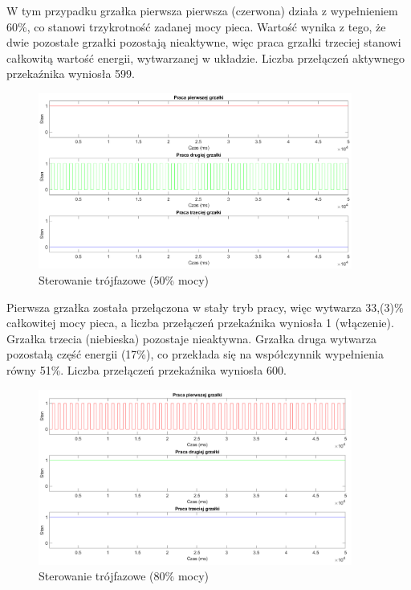 \documentclass[a4paper,twoside,12pt]{book}
\begin{document}
W tym przypadku grzałka pierwsza pierwsza (czerwona) działa z wypełnieniem 60\%, co stanowi trzykrotność zadanej mocy pieca. Wartość wynika z tego, że dwie pozostałe grzałki pozostają nieaktywne, więc praca grzałki trzeciej stanowi całkowitą wartość energii, wytwarzanej w układzie. Liczba przełączeń aktywnego przekaźnika wyniosła 599.

\newpage
\begin{figure}[h]
	\centering
	\includegraphics[width=0.92\textwidth]{./wykresy/png/threePhase50worse.png}
	\caption{Sterowanie trójfazowe (50\% mocy)}
	\label{fig:ThreePhase50worse}
\end{figure}

\noindent Pierwsza grzałka została przełączona w stały tryb pracy, więc wytwarza 33,(3)\% całkowitej mocy pieca, a liczba przełączeń przekaźnika wyniosła 1 (włączenie). Grzałka trzecia (niebieska) pozostaje nieaktywna. Grzałka druga wytwarza pozostałą część energii (17\%), co przekłada się na współczynnik wypełnienia równy 51\%. Liczba przełączeń przekaźnika wyniosła 600.

\begin{figure}[h]
	\centering
	\includegraphics[width=0.92\textwidth]{./wykresy/png/threePhase80worse.png}
	\caption{Sterowanie trójfazowe (80\% mocy)}
	\label{fig:ThreePhase80worse}
\end{figure}
\end{document}
